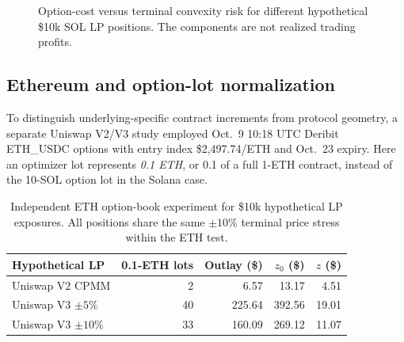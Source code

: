\begin{figure}[ht]
\centering
{}
\caption{Option-cost versus terminal convexity risk for different hypothetical \$10k SOL LP positions. The components are not realized trading profits.}
\label{fig:sol-cost}
\end{figure}

\subsection{Ethereum and option-lot normalization}
To distinguish underlying-specific contract increments from protocol geometry, a separate Uniswap V2/V3 study employed Oct.\ 9 10:18 UTC Deribit ETH\_USDC options with entry index \$2,497.74/ETH and Oct.\ 23 expiry. Here an optimizer lot represents \emph{0.1 ETH}, or 0.1 of a full 1-ETH contract, instead of the 10-SOL option lot in the Solana case.

\begin{table}[ht]
\centering
\caption{Independent ETH option-book experiment for \$10k hypothetical LP exposures. All positions share the same $\pm10\%$ terminal price stress within the ETH test.}
\label{tab:eth}
\small
\begin{tabular}{@{}lrrrr@{}}
\toprule
Hypothetical LP & 0.1-ETH lots & Outlay (\$) & $z_0$ (\$) & $z$ (\$)\\
\midrule
Uniswap V2 CPMM & 2 & 6.57 & 13.17 & 4.51\\
Uniswap V3 $\pm5\%$ & 40 & 225.64 & 392.56 & 19.01\\
Uniswap V3 $\pm10\%$ & 33 & 160.09 & 269.12 & 11.07\\
\bottomrule
\end{tabular}
\end{table}

